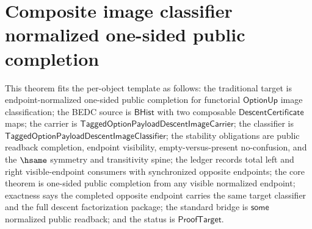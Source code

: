 \section{Composite image classifier normalized one-sided public completion}
\label{sec:option-composite-image-classifier-normalized-one-sided-public-completion}

\begin{theorem}
\label{thm:tagged-option-composite-image-classifier-normalized-one-sided-public-completion}
This theorem fits the per-object template as follows: the traditional target is
endpoint-normalized one-sided public completion for functorial
$\mathsf{OptionUp}$ image classification; the BEDC source is $\mathsf{BHist}$
with two composable $\mathsf{DescentCertificate}$ maps; the carrier is
$\mathsf{TaggedOptionPayloadDescentImageCarrier}$; the classifier is
$\mathsf{TaggedOptionPayloadDescentImageClassifier}$; the stability obligations
are public readback completion, endpoint visibility, empty-versus-present
no-confusion, and the $\hsame$ symmetry and transitivity spine; the ledger
records total left and right visible-endpoint consumers with synchronized
opposite endpoints; the core theorem is one-sided public completion from any
visible normalized endpoint; exactness says the completed opposite endpoint
carries the same target classifier and the full descent factorization package;
the standard bridge is $\mathsf{some}$ normalized public readback; and the
status is $\mathsf{ProofTarget}$.


\end{theorem}
